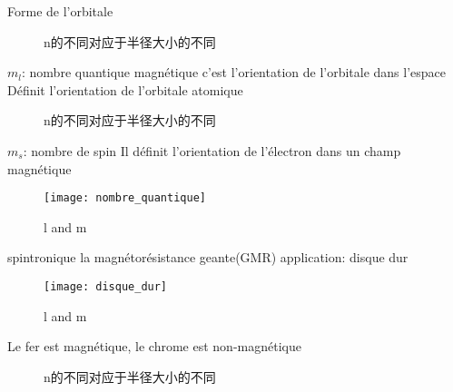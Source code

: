 \documentclass{article}
\begin{document}
Forme de l'orbitale
\begin{figure}[h!]
    \centering
    \hspace{7em} %
    \hspace{7em} %
    \caption{n的不同对应于半径大小的不同}
    \label{fig-sub}
\end{figure}

$m_l$: nombre quantique magn\'etique
c'est l'orientation de l'orbitale dans l'espace
Définit l'orientation de l'orbitale atomique

\begin{figure}[h!]
    \centering
    \hspace{7em} %
    \hspace{7em} %
    \caption{n的不同对应于半径大小的不同}
    \label{fig-sub}
\end{figure}

$m_s$: nombre de spin
Il définit l'orientation de l'électron dans un champ magnétique

\begin{figure}[!htbp]
		\centering
		\texttt{[image: nombre\_quantique]}
		\caption{l and m}
		\label{fig.nombre_quantique.l_m}
\end{figure}

spintronique
la magnétorésistance geante(GMR)
application: disque dur
\begin{figure}[!htbp]
		\centering
		\texttt{[image: disque\_dur]}
		\caption{l and m}
		\label{fig.nombre_quantique.l_m}
\end{figure}

Le fer est magn\'etique, le chrome est non-magn\'etique
\begin{figure}[h!]
    \centering
    \hspace{7em} %
    \caption{n的不同对应于半径大小的不同}
    \label{fig-sub}
\end{figure}
\end{document}

